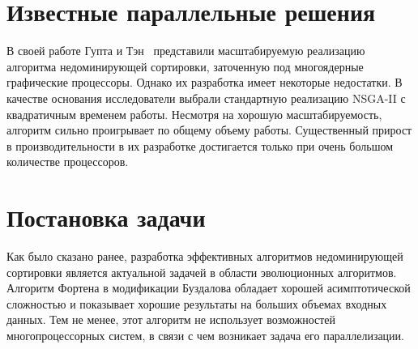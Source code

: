 

\section{Известные параллельные решения}
В своей работе Гупта и Тэн~\cite{gupta15} представили масштабируемую реализацию алгоритма недоминирующей сортировки, заточенную под многоядерные графические процессоры. Однако их разработка имеет некоторые недостатки. В качестве основания исследователи выбрали стандартную реализацию NSGA-II с квадратичным временем работы. Несмотря на хорошую масштабируемость, алгоритм сильно проигрывает по общему объему работы. Существенный прирост в производительности в их разработке достигается только при очень большом количестве процессоров. 

\section{Постановка задачи}
Как было сказано ранее, разработка эффективных алгоритмов недоминирующей сортировки является актуальной задачей в области эволюционных алгоритмов. Алгоритм Фортена в модификации Буздалова обладает хорошей асимптотической сложностью и показывает хорошие результаты на больших объемах входных данных. Тем не менее, этот алгоритм не использует возможностей многопроцессорных систем, в связи с чем возникает задача его параллелизации.
